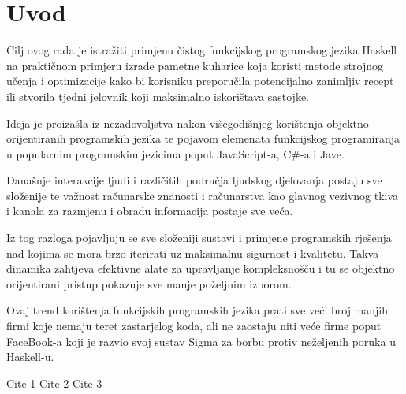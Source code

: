 \chapter{Uvod}

Cilj ovog rada je istražiti primjenu čistog funkcijskog programskog jezika Haskell na praktičnom primjeru izrade pametne kuharice koja koristi metode strojnog učenja i optimizacije kako bi korisniku preporučila potencijalno zanimljiv recept ili stvorila tjedni jelovnik koji maksimalno iskorištava sastojke.

Ideja je proizašla iz nezadovoljstva nakon višegodišnjeg korištenja objektno orijentiranih programskih jezika te pojavom elemenata funkcijskog programiranja u popularnim programskim jezicima poput JavaScript-a, C\#-a i Jave.

Današnje interakcije ljudi i različitih područja ljudskog djelovanja postaju sve složenije te važnost računarske znanosti i računarstva kao glavnog vezivnog tkiva i kanala za razmjenu i obradu informacija postaje sve veća.

Iz tog razloga pojavljuju se sve složeniji sustavi i primjene programskih rješenja nad kojima se mora brzo iterirati uz maksimalnu sigurnost i kvalitetu. Takva dinamika zahtjeva efektivne alate za upravljanje kompleksnošču i tu se objektno orijentirani pristup pokazuje sve manje poželjnim izborom.

Ovaj trend korištenja funkcijskih programskih jezika prati sve veći broj manjih firmi koje nemaju teret zastarjelog  koda, ali ne zaostaju niti veće firme poput FaceBook-a koji je razvio svoj sustav Sigma\cite{sigma} za borbu protiv neželjenih poruka  u Haskell-u.


Cite 1 \cite{banana}
Cite 2 \cite{inteligencija}
Cite 3 \cite{sigma}